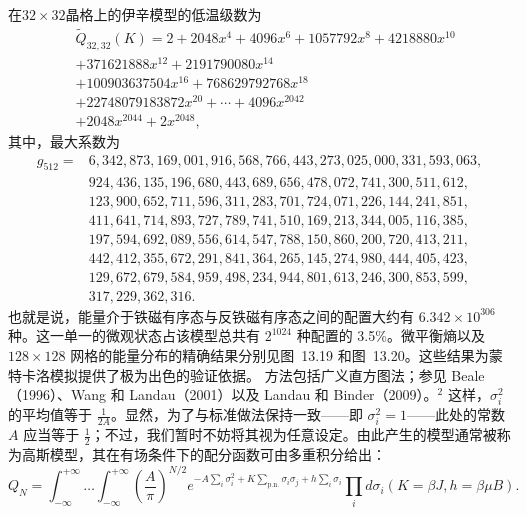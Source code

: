 在\(32 \times 32\)晶格上的伊辛模型的低温级数为
\begin{equation}\tag{13.4.30}\label{eq:13.4.30}
\begin{array}{rl} & { \tilde { Q } _ { 32 , 32 } ( K ) = 2 + 20 48 x ^{4} + 40 96 x ^{6} + 10 57 79 2 x ^{8} + 42 18 88 0 x ^{10} } \\& {  + 37 16 21 88 8 x ^{12} + 21 91 79 00 80 x ^{14} } \\& {  + 10 09 03 63 75 04 x ^{16} + 76 86 29 79 27 68 x ^{18} } \\& {  + 22 74 80 79 18 38 72 x ^{20} + \cdots + 40 96 x ^{20 42} } \\& {  + 20 48 x ^{20 44} + 2 x ^{20 48} , } \end{array}
\end{equation}
其中，最大系数为
\[
\begin{aligned}
g_{512}={}&6,342,873,169,001,916,568,766,443,273,025,000,331,593,063,\\
&924,436,135,196,680,443,689,656,478,072,741,300,511,612,\\
&123,900,652,711,596,311,283,701,724,071,226,144,241,851,\\
&411,641,714,893,727,789,741,510,169,213,344,005,116,385,\\
&197,594,692,089,556,614,547,788,150,860,200,720,413,211,\\
&442,412,355,672,291,841,364,265,145,274,980,444,405,423,\\
&129,672,679,584,959,498,234,944,801,613,246,300,853,599,\\
&317,229,362,316.
\end{aligned}
\]
也就是说，能量介于铁磁有序态与反铁磁有序态之间的配置大约有 \(6.342 \times 10^{306}\) 种。这一单一的微观状态占该模型总共有 \(2^{1024}\) 种配置的 3.5\%。微平衡熵以及 \(128 \times 128\) 网格的能量分布的精确结果分别见图~13.19 和图~13.20。这些结果为蒙特卡洛模拟提供了极为出色的验证依据。
方法包括广义直方图法；参见 Beale（1996）、Wang 和 Landau（2001）以及 Landau 和 Binder（2009）。\(^{2}\)
这样，\(\sigma_{i}^{2}\) 的平均值等于 \(\frac{1}{2A}\)。显然，为了与标准做法保持一致——即 \(\sigma_{i}^{2}=1\)——此处的常数 \(A\) 应当等于 \(\frac{1}{2}\)；不过，我们暂时不妨将其视为任意设定。由此产生的模型通常被称为高斯模型，其在有场条件下的配分函数可由多重积分给出：
\begin{equation}\tag{13.4.31}\label{eq:13.4.31}
Q _ { N } = \int _ { - \infty } ^{+ \infty} \ldots \int _ { - \infty } ^{+ \infty} \left( \frac { A } { \pi } \right) ^{N / 2} e ^{- A \sum _ { i} \sigma _ { i } ^{2} + K \sum _ { \mathrm { p . n . } } \sigma _ { i } \sigma _ { j } + h \sum _ { i } \sigma _ { i } } \prod _ { i } d \sigma _ { i }  ( K = \beta J , h = \beta \mu B ) .
\end{equation}
